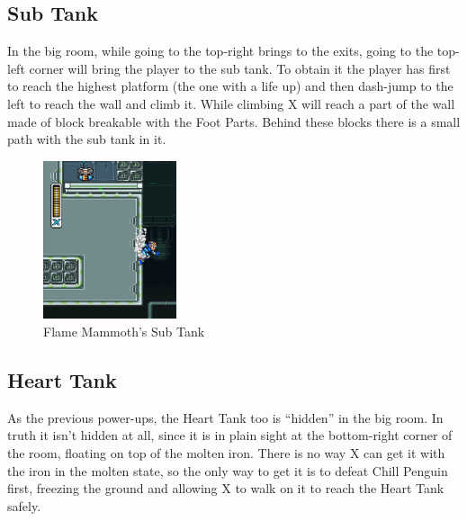 \subsection{Sub Tank}
In the big room, while going to the top-right brings to the exits, going to the top-left corner will bring the player to the sub tank. To obtain it the player has first to reach the highest platform (the one with a life up) and then dash-jump to the left to reach the wall and climb it. While climbing X will reach a part of the wall made of block breakable with the Foot Parts. Behind these blocks there is a small path with the sub tank in it.
\begin{figure}[h]
	\centering
	\includegraphics[width=0.35\textwidth]{figures/X1/Flame_tank.jpg}
	\caption{Flame Mammoth's Sub Tank}
\end{figure}



\subsection{Heart Tank}
As the previous power-ups, the Heart Tank too is ``hidden'' in the big room. In truth it isn't hidden at all, since it is in plain sight at the bottom-right corner of the room, floating on top of the molten iron. There is no way X can get it with the iron in the molten state, so the only way to get it is to defeat Chill Penguin first, freezing the ground and allowing X to walk on it to reach the Heart Tank safely.

